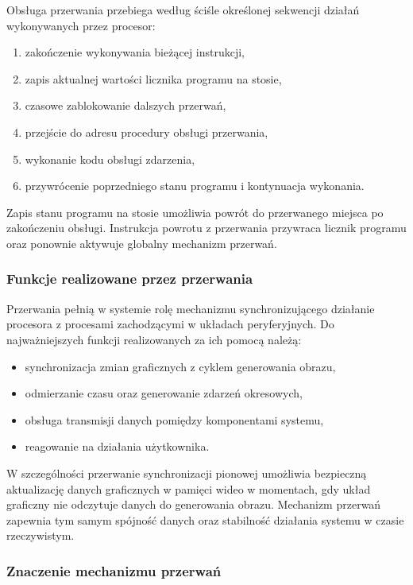 \documentclass{article}
\begin{document}
Obsługa przerwania przebiega według ściśle określonej sekwencji działań wykonywanych przez procesor:
\begin{enumerate}
	\item zakończenie wykonywania bieżącej instrukcji,
	\item zapis aktualnej wartości licznika programu na stosie,
	\item czasowe zablokowanie dalszych przerwań,
	\item przejście do adresu procedury obsługi przerwania,
	\item wykonanie kodu obsługi zdarzenia,
	\item przywrócenie poprzedniego stanu programu i kontynuacja wykonania.
\end{enumerate}

Zapis stanu programu na stosie umożliwia powrót do przerwanego miejsca po zakończeniu obsługi. Instrukcja powrotu z przerwania przywraca licznik programu oraz ponownie aktywuje globalny mechanizm przerwań.

\subsubsection{Funkcje realizowane przez przerwania}

Przerwania pełnią w systemie rolę mechanizmu synchronizującego działanie procesora z procesami zachodzącymi w układach peryferyjnych. Do najważniejszych funkcji realizowanych za ich pomocą należą:
\begin{itemize}
	\item synchronizacja zmian graficznych z cyklem generowania obrazu,
	\item odmierzanie czasu oraz generowanie zdarzeń okresowych,
	\item obsługa transmisji danych pomiędzy komponentami systemu,
	\item reagowanie na działania użytkownika.
\end{itemize}

W szczególności przerwanie synchronizacji pionowej umożliwia bezpieczną aktualizację danych graficznych w pamięci wideo w momentach, gdy układ graficzny nie odczytuje danych do generowania obrazu. Mechanizm przerwań zapewnia tym samym spójność danych oraz stabilność działania systemu w czasie rzeczywistym.

\subsubsection{Znaczenie mechanizmu przerwań}
\end{document}
